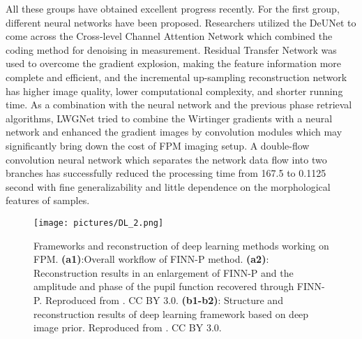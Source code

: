 \documentclass[journal,review,submit,pdftex,moreauthors]{Definitions/mdpi}
\begin{document}
All these groups have obtained excellent progress recently. For the first group, different neural networks have been proposed. Researchers utilized the DeUNet to come across the Cross-level Channel Attention Network which combined the coding method for denoising in measurement\cite{zhang2021cross}. Residual Transfer Network was used to overcome the gradient explosion\cite{wang2022fourier}, making the feature information more complete and efficient, and the incremental up-sampling reconstruction network has higher image quality, lower computational complexity, and shorter running time. As a combination with the neural network and the previous phase retrieval algorithms, LWGNet tried to combine the Wirtinger gradients with a neural network and enhanced the gradient images by convolution modules which may significantly bring down the cost of FPM imaging setup\cite{saha2022lwgnet}. A double-flow convolution neural network which separates the network data flow into two branches has successfully reduced the processing time from 167.5 to 0.1125 second with fine generalizability and little dependence on the morphological features of samples\cite{sun2021double}. 

\begin{figure}[H]
\texttt{[image: pictures/DL\_2.png]}
\caption{Frameworks and reconstruction of deep learning methods working on FPM. \textbf{(a1)}:Overall workflow of FINN-P method. \textbf{(a2)}: Reconstruction results in an enlargement of FINN-P and the amplitude and phase of the pupil function recovered through FINN-P. Reproduced from \cite{sun2019neural}. CC BY 3.0. \textbf{(b1-b2)}: Structure and reconstruction results of deep learning framework based on deep image prior. Reproduced from \cite{chen2022fourier}. CC BY 3.0.
\label{dp}}
\end{figure}
\end{document}
